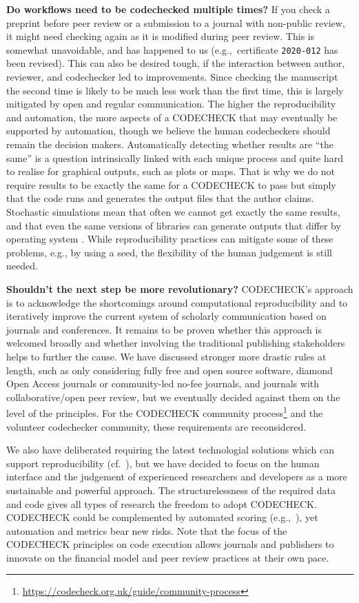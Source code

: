 \documentclass[12pt]{article}
\begin{document}
\textbf{Do workflows need to be codechecked multiple times?}
If you check a preprint before peer
review or a submission to a journal with non-public review, it might
need checking again as it is modified during peer review.
This is somewhat unavoidable, and has happened to us (e.g.,~certificate \texttt{2020-012}
\cite{cert-2020-012} has been revised). This can also be desired tough, if
the interaction between author, reviewer, and codechecker led to
improvements. Since checking the manuscript the second time is likely
to be much less work than the first time, this is largely mitigated by
open and regular communication. The higher the reproducibility and
automation, the more aspects of a CODECHECK that may eventually be
supported by automation, though we believe the human codecheckers
should remain the decision makers. Automatically detecting whether results
are ``the same'' is a question intrinsically linked with each unique
process and quite hard to realise for graphical outputs, such as plots or
maps.
That is why we do not require results to be exactly the same for a
CODECHECK to pass but simply that the code runs and generates the output
files that the author claims. Stochastic simulations mean that often
we cannot get exactly the same results, and that even the same versions of libraries
can generate outputs that differ by operating system
\cite{Gronenschild2012-pp}.
While reproducibility practices can mitigate some of these problems, e.g., by using a seed, the flexibility of the human judgement is still needed.

\textbf{Shouldn't the next step be more revolutionary?}
CODECHECK's approach is to acknowledge the shortcomings around 
computational reproducibility and to iteratively improve the current
system of scholarly communication based on journals and conferences.
It remains to be proven whether this approach is welcomed broadly and whether 
involving the traditional publishing stakeholders helps to further the cause.
We have discussed stronger more drastic rules at length, such as only 
considering fully free and open source software, diamond Open Access journals or community-led no-fee journals,
and journals with collaborative/open peer review, but we eventually decided
against them on the level of the principles.
For the CODECHECK community process\footnote{\url{https://codecheck.org.uk/guide/community-process}}
and the volunteer codechecker community, these requirements are reconsidered.

We also have deliberated requiring the latest technologial solutions which can
support reproducibility (cf.~\cite{konkol_publishing_2020}), but we have 
decided to focus on the human interface and the judgement of experienced
researchers and developers as a more sustainable and powerful approach.
The structurelessness of the required data and code gives all types of research the freedom to adopt CODECHECK.
CODECHECK could be complemented by automated scoring (e.g.,~\cite{menke_rigor_2020}), yet automation and metrics bear new risks.
Note that the focus of the CODECHECK principles on code execution allows journals
and publishers to innovate on the financial model and peer review practices
at their own pace.
\end{document}
